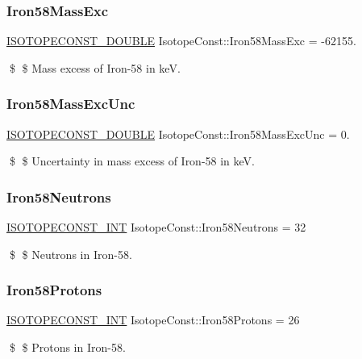 \subsubsection{\texorpdfstring{Iron58\+Mass\+Exc}{Iron58MassExc}}
{\footnotesize\ttfamily \mbox{\hyperlink{group___isotope_const-_macros_ga8f45a7272ce02c0b4c65c44636ed719a}{I\+S\+O\+T\+O\+P\+E\+C\+O\+N\+S\+T\+\_\+\+D\+O\+U\+B\+LE}} Isotope\+Const\+::\+Iron58\+Mass\+Exc = -\/62155.}

\$ \$ Mass excess of Iron-\/58 in keV. \mbox{\label{group___isotope_const-_iron-_fe58_gab30e0afe8c03cd9f024c84df4228d510}} 
\subsubsection{\texorpdfstring{Iron58\+Mass\+Exc\+Unc}{Iron58MassExcUnc}}
{\footnotesize\ttfamily \mbox{\hyperlink{group___isotope_const-_macros_ga8f45a7272ce02c0b4c65c44636ed719a}{I\+S\+O\+T\+O\+P\+E\+C\+O\+N\+S\+T\+\_\+\+D\+O\+U\+B\+LE}} Isotope\+Const\+::\+Iron58\+Mass\+Exc\+Unc = 0.}

\$ \$ Uncertainty in mass excess of Iron-\/58 in keV. \mbox{\label{group___isotope_const-_iron-_fe58_ga9231e564be191d7e1894b7b56c633b80}} 
\subsubsection{\texorpdfstring{Iron58\+Neutrons}{Iron58Neutrons}}
{\footnotesize\ttfamily \mbox{\hyperlink{group___isotope_const-_macros_ga5f18360b3e99483a35c32d789e62621c}{I\+S\+O\+T\+O\+P\+E\+C\+O\+N\+S\+T\+\_\+\+I\+NT}} Isotope\+Const\+::\+Iron58\+Neutrons = 32}

\$ \$ Neutrons in Iron-\/58. \mbox{\label{group___isotope_const-_iron-_fe58_ga0e6d29da7281236fe1717dcd0258ba9b}} 
\subsubsection{\texorpdfstring{Iron58\+Protons}{Iron58Protons}}
{\footnotesize\ttfamily \mbox{\hyperlink{group___isotope_const-_macros_ga5f18360b3e99483a35c32d789e62621c}{I\+S\+O\+T\+O\+P\+E\+C\+O\+N\+S\+T\+\_\+\+I\+NT}} Isotope\+Const\+::\+Iron58\+Protons = 26}

\$ \$ Protons in Iron-\/58. 